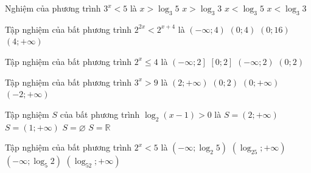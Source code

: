 \begin{ex}%
	Nghiệm của phương trình $3^x<5$  là
	 \choice
		 {$x>{{\log}_3}5$}
		 {$x>{{\log}_3}3$}
		 {\True $x<{{\log}_3}5$}
		 {$x<{{\log}_3}3$}
\end{ex}

\begin{ex}%
	Tập nghiệm của bất phương trình ${2^{2x}}<{2^{x+4}}$ là 
	\choice 
		{\True  $\left(-\infty;4\right)$}
		{$\left(0;4\right)$} 
		{$\left(0;16\right)$} 
		{$\left(4;+\infty \right)$} 
\end{ex}

\begin{ex}%
	Tập nghiệm  của bất phương trình $2^x\le 4$ là
	 \choice
		{\True $\left(-\infty;2\right]$} 
		 {$\left[0;2\right]$}
		{$\left(-\infty;2\right)$} 
		 {$\left(0;2\right)$}
	\loigiai{Ta có $2^x\le  4\Leftrightarrow x\le 2$.\\
	Tập nghiệm của  bất phương trình là $\left(-\infty;2\right]$.}
\end{ex}

\begin{ex}%
	Tập  nghiệm của bất phương trình $3^x>9$ là
	\choice 
		{\True $\left(2;+\infty \right)$} 
		{$\left(0;2\right)$} 
		{$\left(0;+\infty  \right)$}
		 {$\left(-2;+\infty \right)$}
\end{ex}

\begin{ex}%
	 Tập nghiệm $S$ của bất phương trình $\log_2(x-1)>0$ là
	 \choice
		{\True $S=\left(2;+\infty\right)$} 
		{$S=\left(1;+\infty\right)$} 
		 {$S=\varnothing$}
		 {$S=\mathbb{R}$}
\end{ex}

\begin{ex}%
	Tập nghiệm của bất  phương trình $2^x < 5$ là
	 \choice
		{\True $\left(-\infty;\log_2  5\right)$}
		 {$\left(\log_25;+\infty\right)$}
		{$\left(-\infty;\log_5  2\right)$}
		{$\left(\log_52;+\infty\right)$} 
\end{ex}

